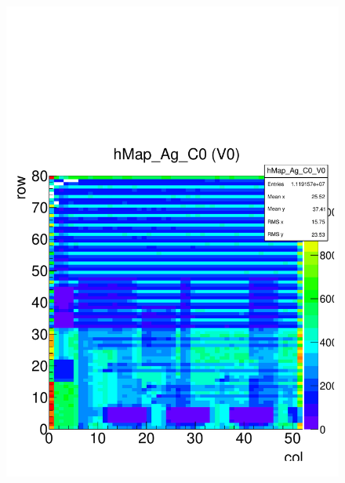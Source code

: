 \documentclass[a4paper,12pt,twoside]{article}
\begin{document}
\begin{figure} [h!]
\centering
\begin{minipage}{.48\textwidth}
  \centering
  \includegraphics[width=\textwidth]{./Figures/HRData_Hitmap.pdf}
  \label{HRData-Hitmap}
\end{minipage}%
\hspace{2mm}
\begin{minipage}{.48\textwidth}
  \centering

\end{minipage}
\end{figure}
\end{document}
